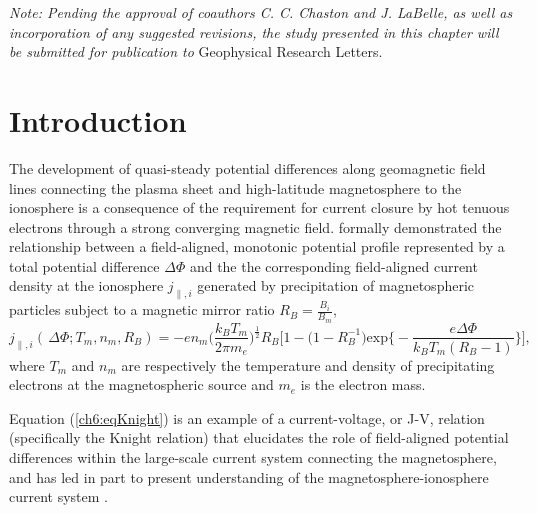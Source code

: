 \textit{Note: Pending the approval of coauthors C. C. Chaston and J. LaBelle, as
  well as incorporation of any suggested revisions, the study presented in this
  chapter will be submitted for publication to} Geophysical Research Letters.

  \section{Introduction}

  The development of quasi-steady potential differences along geomagnetic field
  lines connecting the plasma sheet and high-latitude magnetosphere to the
  ionosphere is a consequence of the requirement for current closure by hot
  tenuous electrons through a strong converging magnetic
  field. \citet{Knight1973} formally demonstrated the relationship between a
  field-aligned, monotonic potential profile represented by a total potential
  difference $\Delta \Phi$ and the the corresponding field-aligned current
  density at the ionosphere $j_{\parallel,i}$ generated by precipitation of
  magnetospheric particles subject to a magnetic mirror ratio
  $R_B = \frac{B_{i}}{B_{m}}$,
  \begin{equation} \label{ch6:eqKnight} j_{\parallel,i} ( \, \Delta \Phi ; T_m,
    n_m, R_B ) = - e n_m \Big ( \dfrac{k_B T_m}{2 \pi m_e} \Big )^{\frac{1}{2}}
    R_B \Bigg [ 1 - \Big ( 1 - R_B^{-1} \Big ) \textrm{exp} \Big \{ - \dfrac{e
      \Delta \Phi}{k_B T_m ( R_B - 1 )} \Big \} \Bigg],
  \end{equation}
  where $T_m$ and $n_m$ are respectively the temperature and density of
  precipitating electrons at the magnetospheric source and $m_e$ is the electron
  mass.


  Equation (\ref{ch6:eqKnight}) is an example of a current-voltage, or J-V,
  relation (specifically the Knight relation) that elucidates the role of
  field-aligned potential differences within the large-scale current system
  connecting the magnetosphere, and has led in part to present understanding of
  the magnetosphere-ionosphere current system
  \citep[e.g.,][]{Temerin1997,Hultqvist1999,Cowley2000,Bostrom2003a,Paschmann2003,Pierrard2007a,Karlsson2012}.

